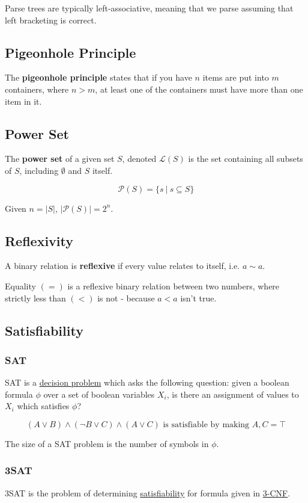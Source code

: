 \documentclass{article}
\begin{document}
Parse trees are typically left-associative, meaning that we parse assuming that left bracketing is correct.


\subsection{Pigeonhole Principle}\label{pigeonhole-principle}
The \textbf{pigeonhole principle} states that if you have $n$ items are put into $m$ containers, where $n > m$, at least one of the containers must have more than one item in it.


\subsection{Power Set}\label{power-set}
The \textbf{power set} of a given set $S$, denoted $\mathcal{L}(S)$ is the set containing all subsets of $S$, including $\emptyset$ and $S$ itself.

\[\mathcal{P}(S) = \{s \:|\: s \subseteq S\}\]

Given $n=|S|$, $|\mathcal{P}(S)|=2^n$.


\subsection{Reflexivity}\label{reflexive}
A binary relation is \textbf{reflexive} if every value relates to itself, i.e. $a \sim a$.

Equality $(=)$ is a reflexive binary relation between two numbers, where strictly less than $(<)$ is not - because $a < a$ isn't true.


\subsection{Satisfiability}
\subsubsection{SAT}\label{sat}
SAT is a \hyperref[decision-problem]{decision problem} which asks the following question: given a boolean formula $\phi$ over a set of boolean variables $X_i$, is there an assignment of values to $X_i$ which satisfies $\phi$?

\[(A \vee B) \wedge (\neg B \vee C) \wedge (A \vee C)\text{ is satisfiable by making $A, C = \top$}\]

The size of a SAT problem is the number of symbols in $\phi$.

\subsubsection{3SAT}
3SAT is the problem of determining \hyperref[sat]{satisfiability} for formula given in \hyperref[cnf]{3-CNF}.
\end{document}
